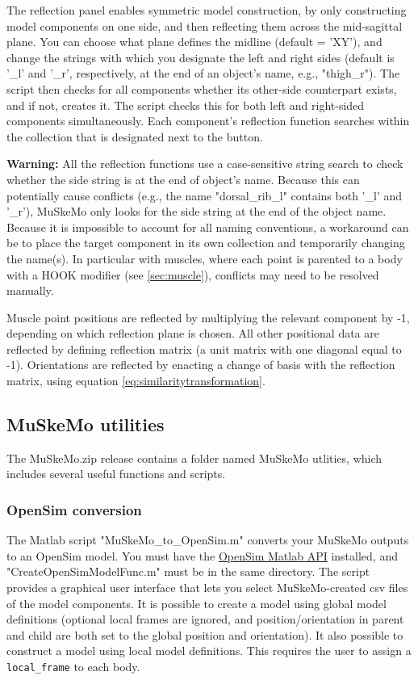 \documentclass{article}
\begin{document}
The reflection panel enables symmetric model construction, by only constructing model components on one side, and then reflecting them across the mid-sagittal plane. You can choose what plane defines the midline (default = 'XY'), and change the strings with which you designate the left and right sides (default is '\_l' and '\_r', respectively, at the end of an object's name, e.g., "thigh\_r"). The script then checks for all components whether its other-side counterpart exists, and if not, creates it. The script checks this for both left and right-sided components simultaneously. Each component's reflection function searches within the collection that is designated next to the button.

\textbf{Warning:} All the reflection functions use a case-sensitive string search to check whether the side string is at the end of object's name. Because this can potentially cause conflicts (e.g., the name "dorsal\_rib\_l" contains both '\_l' and '\_r'), MuSkeMo only looks for the side string at the end of the object name. Because it is impossible to account for all naming conventions, a workaround can be to place the target component in its own collection and temporarily changing the name(s). In particular with muscles, where each point is parented to a body with a HOOK modifier (see \ref{sec:muscle}), conflicts may need to be resolved manually.

Muscle point positions are reflected by multiplying the relevant component by -1, depending on which reflection plane is chosen. All other positional data are reflected by defining reflection matrix (a unit matrix with one diagonal equal to -1). Orientations are reflected by enacting a change of basis with the reflection matrix, using equation \ref{eq:similaritytransformation}.

\subsection{MuSkeMo utilities}
\label{sec:muskemoutilities}

The MuSkeMo.zip release contains a folder named MuSkeMo utlities, which includes several useful functions and scripts. 

\subsubsection{OpenSim conversion}
The Matlab script "MuSkeMo\_to\_OpenSim.m" converts your MuSkeMo outputs to an OpenSim model. You must have the \href{https://opensimconfluence.atlassian.net/wiki/spaces/OpenSim/pages/53089380/Scripting+with+Matlab}{OpenSim Matlab API} installed, and "CreateOpenSimModelFunc.m" must be in the same directory. The script provides a graphical user interface that lets you select MuSkeMo-created csv files of the model components. It is possible to create a model using global model definitions (optional local frames are ignored, and position/orientation in parent and child are both set to the global position and orientation). It also possible to construct a model using local model definitions. This requires the user to assign a  \texttt{local\_frame} to each body. 
\end{document}
